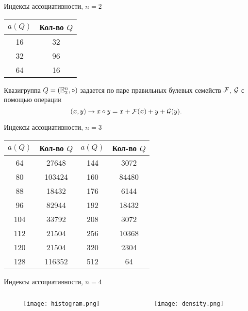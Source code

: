 \begin{frame}{Индексы ассоциативности, $n=2$}
    \begin{center}
        \begin{tabular}{|c|c|}
            \hline
            $a(Q)$ & Кол-во $Q$ \\
            \hline
            16 & 32 \\
            \hline
            32 & 96 \\
            \hline
            64 & 16 \\
            \hline
        \end{tabular}
        \; \par 
        \; \par
        Квазигруппа $Q = (\mathbb{E}_2^n, \circ)$ задается по паре правильных булевых семейств $\mathcal{F}$, $\mathcal{G}$ с помощью операции
        \[
            (x, y) \to x \circ y = x + \mathcal{F}(x) + y + \mathcal{G}(y).
        \]
    \end{center}
\end{frame}


\begin{frame}{Индексы ассоциативности, $n=3$}
    \begin{center}
        \begin{tabular}{|c|c|c|c|}
            \hline
            $a(Q)$ & Кол-во $Q$ & $a(Q)$ & Кол-во $Q$ \\
            \hline
            64 & 27648 & 144 & 3072\\
            80 & 103424 & 160 & 84480 \\
            88 & 18432 & 176 & 6144\\
            96 & 82944 & 192 & 18432\\
            104 & 33792 & 208 & 3072\\
            112 & 21504 & 256 & 10368\\
            120 & 21504 & 320 & 2304\\
            128 & 116352 & 512 & 64\\
            \hline
        \end{tabular}
    \end{center}
\end{frame}


\begin{frame}{Индексы ассоциативности, $n=4$}
    \begin{columns}[T] %
        \begin{column}{.49\textwidth}
            \begin{figure}[h]
                \centering 
                \texttt{[image: histogram.png]}
            \end{figure}
        \end{column}%
        \hfill%
        \begin{column}{.49\textwidth}
            \begin{figure}[h]
                \centering 
                \texttt{[image: density.png]}
            \end{figure}
        \end{column}%
    \end{columns}  
\end{frame}


